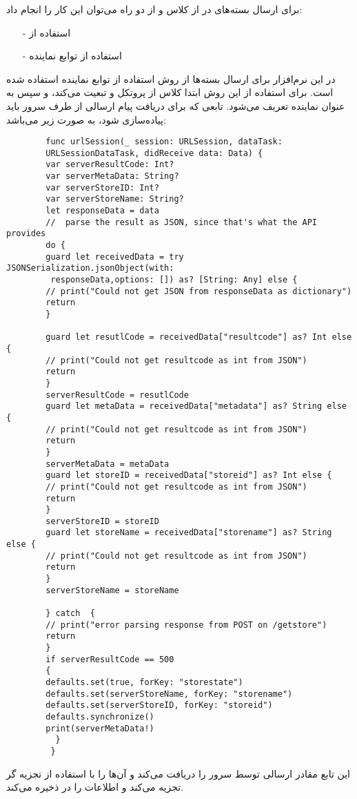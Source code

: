 \documentclass[oneside]{report}
\begin{document}
برای ارسال بسته‌های 
						{\normalsize {}}
	در 
							{\normalsize {}}
					از کلاس
											{\normalsize {}} 
						و	از دو راه می‌توان این کار را انجام داد:
\begin{itemize}
	\item[-]
	استفاده از 
							{\normalsize {}}
	\item[-]
	استفاده از توابع نماینده
\end{itemize}
	در این نرم‌افزار برای ارسال بسته‌ها از روش استفاده از توابع نماینده استفاده شده است. برای استفاده از این روش 
	ابتدا کلاس
							{\normalsize {}}
				از پروتکل 
										{\normalsize {}}
										و 
									{\normalsize {}}
				تبعیت می‌کند، و سپس به عنوان نماینده‌ تعریف می‌شود.
	تابعی که برای دریافت پیام ارسالی از طرف سرور باید پیاده‌سازی شود، به صورت زیر می‌باشد: 
	\begin{latin}
		\begin{verbatim}
		func urlSession(_ session: URLSession, dataTask: 
		URLSessionDataTask, didReceive data: Data) {
		var serverResultCode: Int?
		var serverMetaData: String?
		var serverStoreID: Int?
		var serverStoreName: String?
		let responseData = data
		//  parse the result as JSON, since that's what the API provides
		do {
		guard let receivedData = try JSONSerialization.jsonObject(with:
		 responseData,options: []) as? [String: Any] else {
		// print("Could not get JSON from responseData as dictionary")
		return
		}
		
		guard let resutlCode = receivedData["resultcode"] as? Int else {
		// print("Could not get resultcode as int from JSON")
		return
		}
		serverResultCode = resutlCode
		guard let metaData = receivedData["metadata"] as? String else {
		// print("Could not get resultcode as int from JSON")
		return
		}
		serverMetaData = metaData
		guard let storeID = receivedData["storeid"] as? Int else {
		// print("Could not get resultcode as int from JSON")
		return
		}
		serverStoreID = storeID
		guard let storeName = receivedData["storename"] as? String else {
		// print("Could not get resultcode as int from JSON")
		return
		}
		serverStoreName = storeName
		
		} catch  {
		// print("error parsing response from POST on /getstore")
		return
		}
		if serverResultCode == 500
		{
		defaults.set(true, forKey: "storestate")
		defaults.set(serverStoreName, forKey: "storename")
		defaults.set(serverStoreID, forKey: "storeid")
		defaults.synchronize()
		print(serverMetaData!)
		  }
		 }
		\end{verbatim}
		
	\end{latin}	
	این تابع مقادر ارسالی توسط سرور را دریافت می‌کند و آن‌ها را با استفاده از تجزیه گر 
								{\normalsize {}}
								تجزیه می‌کند و اطلاعات را در 
															{\normalsize {}}
															ذخیره می‌کند. 
	
	
	
	
	
	
	
	\newpage
	\def\bibname{مراجع}
	
	
\end{document}
